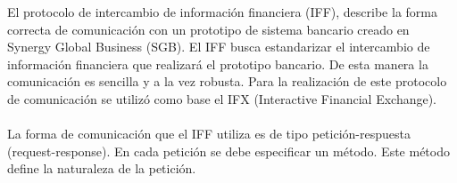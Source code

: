 El protocolo de intercambio de información financiera (IFF), describe la forma correcta de comunicación con un prototipo de sistema bancario creado en Synergy Global Business (SGB). El IFF busca estandarizar el intercambio de información financiera que realizará el prototipo bancario. De esta manera la comunicación es sencilla y a la vez robusta. Para la realización de este protocolo de comunicación se utilizó como base el IFX (Interactive Financial Exchange).
\\
\\ 
La forma de comunicación que el IFF	utiliza es de tipo petición-respuesta (request-response). En cada petición se debe especificar un método. Este método define la naturaleza de la petición.